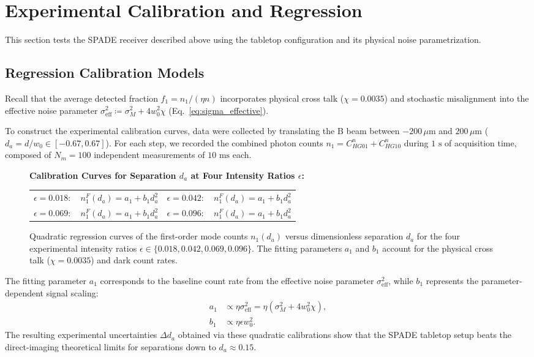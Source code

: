 \section{Experimental Calibration and Regression}
\label{sec:astrophysical_experiment}

This section tests the SPADE receiver described above using the tabletop configuration and its physical noise parametrization.

\subsection{Regression Calibration Models}
Recall that the average detected fraction $f_1 = n_1/(\eta n)$ incorporates physical cross talk ($\chi = 0.0035$) and stochastic misalignment into the effective noise parameter $\sigma_{\text{eff}}^2 \coloneqq \sigma_M^2 + 4w_0^2\chi$ (Eq.~\eqref{eq:sigma_effective}).

To construct the experimental calibration curves, data were collected by translating the B beam between $-200\,\mu\text{m}$ and $200\,\mu\text{m}$ ($d_a = d/w_0 \in [-0.67, 0.67]$). For each step, we recorded the combined photon counts $n_1 = C^n_{HG01} + C^n_{HG10}$ during $1\text{ s}$ of acquisition time, composed of $N_m = 100$ independent measurements of $10\text{ ms}$ each.

\begin{figure}[h!]
    \centering
    \begin{center}
        \textbf{Calibration Curves for Separation $d_a$ at Four Intensity Ratios $\epsilon$:} \\
        \begin{tabular}{cc}
            $\epsilon = 0.018: \quad n_1^F(d_a) = a_1 + b_1 d_a^2$ & $\epsilon = 0.042: \quad n_1^F(d_a) = a_1 + b_1 d_a^2$ \\
            $\epsilon = 0.069: \quad n_1^F(d_a) = a_1 + b_1 d_a^2$ & $\epsilon = 0.096: \quad n_1^F(d_a) = a_1 + b_1 d_a^2$
        \end{tabular}
    \end{center}
    \caption{Quadratic regression curves of the first-order mode counts $n_1(d_a)$ versus dimensionless separation $d_a$ for the four experimental intensity ratios $\epsilon \in \{0.018, 0.042, 0.069, 0.096\}$. The fitting parameters $a_1$ and $b_1$ account for the physical cross talk ($\chi = 0.0035$) and dark count rates.}
    \label{fig:calibration_da_link}
\end{figure}

The fitting parameter $a_1$ corresponds to the baseline count rate from the effective noise parameter $\sigma_{\text{eff}}^2$, while $b_1$ represents the parameter-dependent signal scaling:
\begin{align}
    a_1 & \propto \eta \sigma_{\text{eff}}^2 = \eta (\sigma_M^2 + 4w_0^2\chi), \\
    b_1 & \propto \eta \epsilon w_0^2.
\end{align}
The resulting experimental uncertainties $\Delta d_a$ obtained via these quadratic calibrations show that the SPADE tabletop setup beats the direct-imaging theoretical limits for separations down to $d_a \approx 0.15$.

